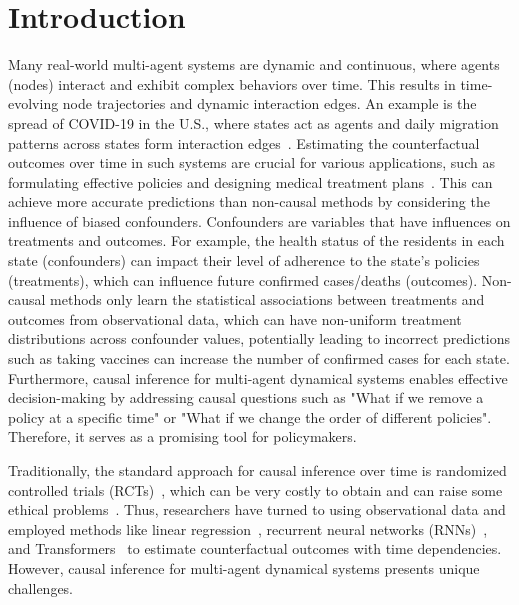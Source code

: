 \section{Introduction}
Many real-world multi-agent systems are dynamic and continuous, where agents (nodes) interact and exhibit complex behaviors over time. This results in time-evolving node trajectories and dynamic interaction edges. An example is the spread of  COVID-19 in the U.S., where states act as agents and daily migration patterns across states form interaction edges~\cite{huang2021coupled,covidpolicy}. 
Estimating the counterfactual outcomes over time in such %
systems are crucial for various applications, such as formulating effective policies and designing medical treatment plans~\cite{seedat2022continuous,bica2020crn,bellot2021policy}. 
This can achieve more accurate predictions than non-causal methods by considering the influence of biased confounders. 
Confounders are variables that have influences on treatments and outcomes. 
For example, the health status of the residents in each state (confounders) can impact their level of adherence to the state's policies (treatments), which can influence future confirmed cases/deaths (outcomes). 
Non-causal methods only learn the statistical associations between treatments and outcomes from observational data, which can have non-uniform treatment distributions across confounder values, potentially leading to incorrect predictions such as taking vaccines can increase the number of confirmed cases for each state. Furthermore, causal inference for multi-agent dynamical systems enables effective decision-making by addressing causal questions such as "What if we remove a policy at a specific time" or "What if we change the order of different policies". Therefore, it serves as a promising tool for policymakers. 

Traditionally, the standard approach for causal inference over time is randomized controlled trials (RCTs)~\cite{chalmers1981method}, which can be very costly to obtain and can raise some ethical problems~\cite{seedat2022continuous,bica2020crn}. Thus, researchers have turned to using observational data and employed methods like 
linear regression~\cite{robins2000marginal}, recurrent neural networks (RNNs)~\cite{lim2018forecasting,BicaAJS20}, and Transformers~\cite{MelnychukFF22} to estimate counterfactual outcomes with time dependencies. 
However, causal inference for multi-agent dynamical systems presents unique challenges. 

